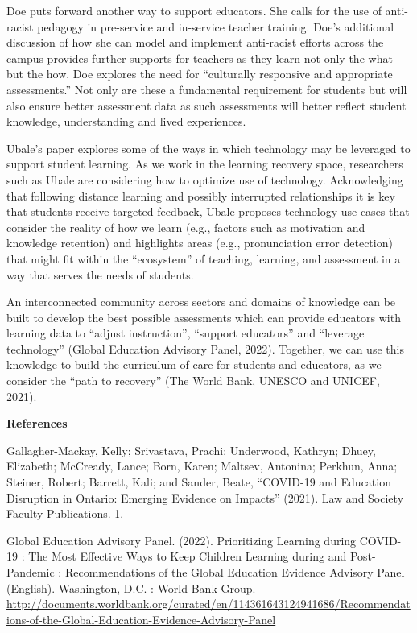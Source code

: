 \documentclass[
]{book}
\begin{document}
Doe puts forward another way to support educators. She calls for the use of anti-racist pedagogy in pre-service and in-service teacher training. Doe's additional discussion of how she can model and implement anti-racist efforts across the campus provides further supports for teachers as they learn not only the what but the how. Doe explores the need for ``culturally responsive and appropriate assessments.'' Not only are these a fundamental requirement for students but will also ensure better assessment data as such assessments will better reflect student knowledge, understanding and lived experiences.

Ubale's paper explores some of the ways in which technology may be leveraged to support student learning. As we work in the learning recovery space, researchers such as Ubale are considering how to optimize use of technology. Acknowledging that following distance learning and possibly interrupted relationships it is key that students receive targeted feedback, Ubale proposes technology use cases that consider the reality of how we learn (e.g., factors such as motivation and knowledge retention) and highlights areas (e.g., pronunciation error detection) that might fit within the ``ecosystem'' of teaching, learning, and assessment in a way that serves the needs of students.

An interconnected community across sectors and domains of knowledge can be built to develop the best possible assessments which can provide educators with learning data to ``adjust instruction'', ``support educators'' and ``leverage technology'' (Global Education Advisory Panel, 2022). Together, we can use this knowledge to build the curriculum of care for students and educators, as we consider the ``path to recovery'' (The World Bank, UNESCO and UNICEF, 2021).

\textbf{References}

Gallagher-Mackay, Kelly; Srivastava, Prachi; Underwood, Kathryn; Dhuey, Elizabeth; McCready, Lance; Born, Karen; Maltsev, Antonina; Perkhun, Anna; Steiner, Robert; Barrett, Kali; and Sander, Beate, ``COVID-19 and Education Disruption in Ontario: Emerging Evidence on Impacts'' (2021). Law and Society Faculty Publications. 1.

Global Education Advisory Panel. (2022). Prioritizing Learning during COVID-19 : The Most Effective Ways to Keep Children Learning during and Post-Pandemic : Recommendations of the Global Education Evidence Advisory Panel (English). Washington, D.C. : World Bank Group. \url{http://documents.worldbank.org/curated/en/114361643124941686/Recommendations-of-the-Global-Education-Evidence-Advisory-Panel}
\end{document}
